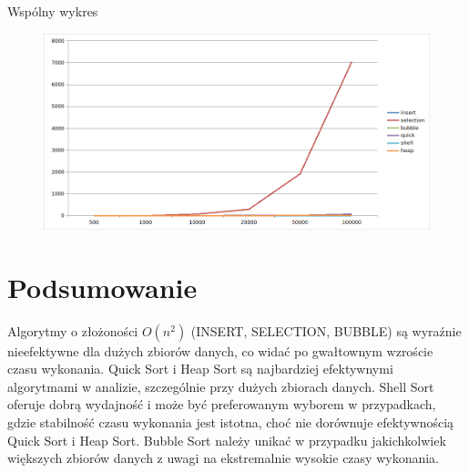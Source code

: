 \documentclass{article}
\begin{document}
Wspólny wykres
\begin{figure}[H]
    \centering
    \includegraphics[width=\textwidth]{"../assets/3_3.png"}
    \label{fig:3_3}
\end{figure}


\section*{Podsumowanie}


Algorytmy o złożoności $O(n^2)$ (INSERT, SELECTION, BUBBLE) są wyraźnie nieefektywne dla dużych zbiorów danych, co widać po gwałtownym wzroście czasu wykonania. \newline
Quick Sort i Heap Sort są najbardziej efektywnymi algorytmami w analizie, szczególnie przy dużych zbiorach danych. \newline
Shell Sort oferuje dobrą wydajność i może być preferowanym wyborem w przypadkach, gdzie stabilność czasu wykonania jest istotna, choć nie dorównuje efektywnością Quick Sort i Heap Sort. \newline
Bubble Sort należy unikać w przypadku jakichkolwiek większych zbiorów danych z uwagi na ekstremalnie wysokie czasy wykonania. \newline
\end{document}
